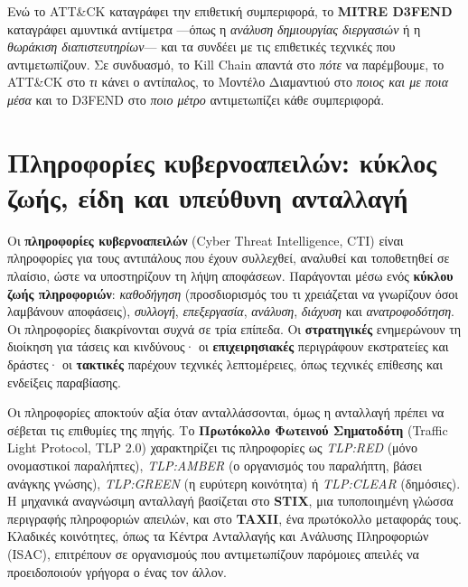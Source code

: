 Ενώ το ATT\&CK καταγράφει την επιθετική συμπεριφορά, το \textbf{MITRE D3FEND} καταγράφει αμυντικά αντίμετρα —όπως η \emph{ανάλυση δημιουργίας διεργασιών} ή η \emph{θωράκιση διαπιστευτηρίων}— και τα συνδέει με τις επιθετικές τεχνικές που αντιμετωπίζουν. Σε συνδυασμό, το Kill Chain απαντά στο \emph{πότε} να παρέμβουμε, το ATT\&CK στο \emph{τι} κάνει ο αντίπαλος, το Μοντέλο Διαμαντιού στο \emph{ποιος και με ποια μέσα} και το D3FEND στο \emph{ποιο μέτρο} αντιμετωπίζει κάθε συμπεριφορά.

\section{Πληροφορίες κυβερνοαπειλών: κύκλος ζωής, είδη και υπεύθυνη ανταλλαγή}\label{sec:3.6}
Οι \textbf{πληροφορίες κυβερνοαπειλών} (Cyber Threat Intelligence, CTI) είναι πληροφορίες για τους αντιπάλους που έχουν συλλεχθεί, αναλυθεί και τοποθετηθεί σε πλαίσιο, ώστε να υποστηρίζουν τη λήψη αποφάσεων. Παράγονται μέσω ενός \textbf{κύκλου ζωής πληροφοριών}: \emph{καθοδήγηση} (προσδιορισμός του τι χρειάζεται να γνωρίζουν όσοι λαμβάνουν αποφάσεις), \emph{συλλογή}, \emph{επεξεργασία}, \emph{ανάλυση}, \emph{διάχυση} και \emph{ανατροφοδότηση}. Οι πληροφορίες διακρίνονται συχνά σε τρία επίπεδα. Οι \textbf{στρατηγικές} ενημερώνουν τη διοίκηση για τάσεις και κινδύνους· οι \textbf{επιχειρησιακές} περιγράφουν εκστρατείες και δράστες· οι \textbf{τακτικές} παρέχουν τεχνικές λεπτομέρειες, όπως τεχνικές επίθεσης και ενδείξεις παραβίασης.

Οι πληροφορίες αποκτούν αξία όταν ανταλλάσσονται, όμως η ανταλλαγή πρέπει να σέβεται τις επιθυμίες της πηγής. Το \textbf{Πρωτόκολλο Φωτεινού Σηματοδότη} (Traffic Light Protocol, TLP 2.0) χαρακτηρίζει τις πληροφορίες ως \emph{TLP:RED} (μόνο ονομαστικοί παραλήπτες), \emph{TLP:AMBER} (ο οργανισμός του παραλήπτη, βάσει ανάγκης γνώσης), \emph{TLP:GREEN} (η ευρύτερη κοινότητα) ή \emph{TLP:CLEAR} (δημόσιες). Η μηχανικά αναγνώσιμη ανταλλαγή βασίζεται στο \textbf{STIX}, μια τυποποιημένη γλώσσα περιγραφής πληροφοριών απειλών, και στο \textbf{TAXII}, ένα πρωτόκολλο μεταφοράς τους. Κλαδικές κοινότητες, όπως τα Κέντρα Ανταλλαγής και Ανάλυσης Πληροφοριών (ISAC), επιτρέπουν σε οργανισμούς που αντιμετωπίζουν παρόμοιες απειλές να προειδοποιούν γρήγορα ο ένας τον άλλον.

